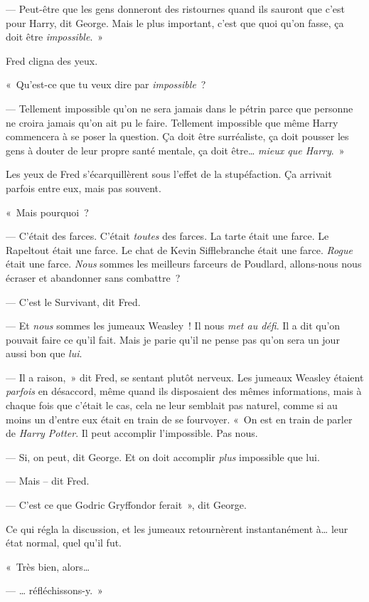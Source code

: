 --- Peut-être que les gens donneront des ristournes quand ils sauront que c'est pour Harry, dit George.
Mais le plus important, c'est que quoi qu'on fasse, ça doit être \emph{impossible}.~»

Fred cligna des yeux.

«~Qu'est-ce que tu veux dire par \emph{impossible}~?

--- Tellement impossible qu'on ne sera jamais dans le pétrin parce que personne ne croira jamais qu'on ait pu le faire.
Tellement impossible que même Harry commencera à se poser la question.
Ça doit être surréaliste, ça doit pousser les gens à douter de leur propre santé mentale, ça doit être…
\emph{mieux que Harry}.~»

Les yeux de Fred s'écarquillèrent sous l'effet de la stupéfaction.
Ça arrivait parfois entre eux, mais pas souvent.

«~Mais pourquoi~?

--- C'était des farces.
C'était \emph{toutes} des farces.
La tarte était une farce.
Le Rapeltout était une farce.
Le chat de Kevin Sifflebranche était une farce.
\emph{Rogue} était une farce.
\emph{Nous} sommes les meilleurs farceurs de Poudlard, allons-nous nous écraser et abandonner sans combattre~?

--- C'est le Survivant, dit Fred.

--- Et \emph{nous} sommes les jumeaux Weasley~!
Il nous \emph{met au défi}.
Il a dit qu'on pouvait faire ce qu'il fait.
Mais je parie qu'il ne pense pas qu'on sera un jour aussi bon que \emph{lui}.

--- Il a raison,~» dit Fred, se sentant plutôt nerveux.
Les jumeaux Weasley étaient \emph{parfois} en désaccord, même quand ils disposaient des mêmes informations, mais à chaque fois que c'était le cas, cela ne leur semblait pas naturel, comme si au moins un d'entre eux était en train de se fourvoyer.
«~On est en train de parler de \emph{Harry Potter}.
Il peut accomplir l'impossible.
Pas nous.

--- Si, on peut, dit George.
Et on doit accomplir \emph{plus} impossible que lui.

--- Mais -- dit Fred.

--- C'est ce que Godric Gryffondor ferait~», dit George.

Ce qui régla la discussion, et les jumeaux retournèrent instantanément à… leur état normal, quel qu'il fut.

«~Très bien, alors…

--- … réfléchissons-y.~»
